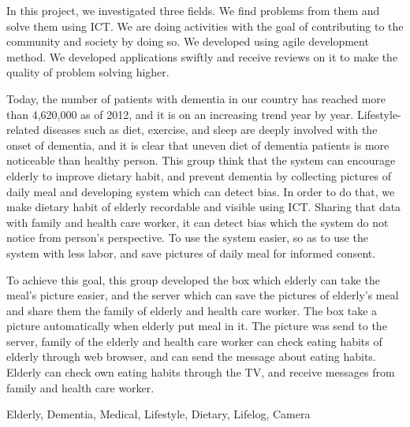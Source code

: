 \documentclass[../report]{subfiles}
\begin{document}
\begin{eabstract}
In this project, we investigated three fields.
We find problems from them and solve them using ICT.
We are doing activities with the goal of contributing to the community and society by doing so.
We developed using agile development method.
We developed applications swiftly and receive reviews on it to make the quality of problem solving higher.

Today, the number of patients with dementia in our country has reached more than 4,620,000 as of 2012, and it is on an increasing trend year by year.
Lifestyle-related diseases such as diet, exercise, and sleep are deeply involved with the onset of dementia, and it is clear that uneven diet of dementia patients is more noticeable than healthy person.
This group think that the system can encourage elderly to improve dietary habit, and prevent dementia by collecting pictures of daily meal and developing system which can detect bias.
In order to do that, we make dietary habit of elderly recordable and visible using ICT.
Sharing that data with family and health care worker, it can detect bias which the system do not notice from person's perspective.
To use the system easier, so as to use the system with less labor, and save pictures of daily meal for informed consent.

To achieve this goal, this group developed the box which elderly can take the meal's picture easier, and the server which can save the pictures of elderly's meal and share them the family of elderly and health care worker.
The box take a picture automatically when elderly put meal in it.
The picture was send to the server, family of the elderly and health care worker can check eating habits of elderly through web browser, and can send the message about eating habits.
Elderly can check own eating habits through the TV, and receive messages from family and health care worker.

\begin{ekeyword}
Elderly, Dementia, Medical, Lifestyle, Dietary, Lifelog, Camera
\end{ekeyword}
\end{eabstract}
\end{document}

